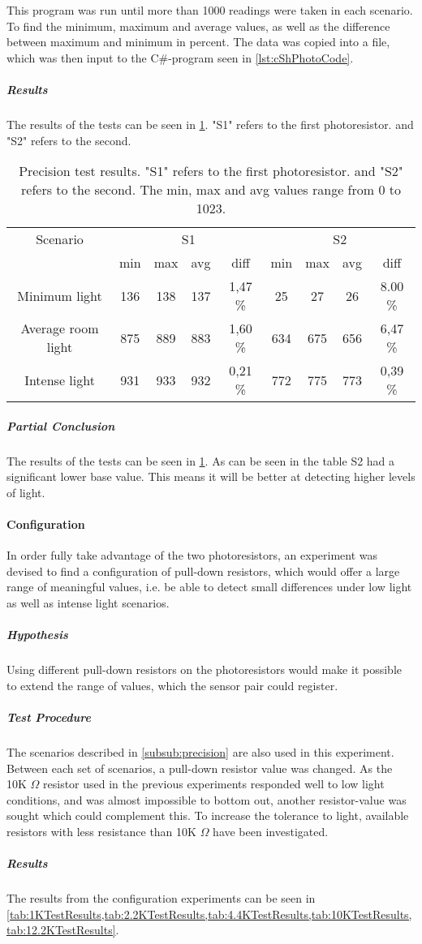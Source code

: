 This program was run until more than 1000 readings were taken in each scenario.
To find the minimum, maximum and average values, as well as the difference between maximum and minimum in percent. The data was copied into a file, which was then input to the C\#-program seen in \cref{lst:cShPhotoCode}.

\subparagraph{Results}
The results of the tests can be seen in \cref{tab:precisionTestResults}. "S1" refers to the first photoresistor. and "S2" refers to the second.

  \begin{table}[htbp]
    \centering
    \begin{tabular}{*{9}{c}}
      \toprule
      Scenario & \multicolumn{4}{c}{S1} & \multicolumn{4}{c}{S2} \\
      \cmidrule(rl){2-5} 
      \cmidrule(rl){6-9}
       & min & max & avg & diff & min & max & avg & diff \\ \midrule
      Minimum light & 136 & 138 & 137 & 1,47 \% & 25 & 27 & 26 & 8.00 \% \\
      Average room light & 875 & 889 & 883 & 1,60 \%  & 634 & 675 & 656 & 6,47 \% \\
      Intense light & 931 & 933 & 932 & 0,21 \%  & 772 & 775 & 773 & 0,39 \% \\ \bottomrule
    \end{tabular}
    \caption[Precision test results]{Precision test results. "S1" refers to the first photoresistor. and
      "S2" refers to the second. The min, max and avg values range from 0 to 1023.}\label{tab:precisionTestResults}
  \end{table}

\subparagraph{Partial Conclusion}
The results of the tests can be seen in \cref{tab:precisionTestResults}. As can be seen in the table S2 had a significant lower base value. This means it will be better at detecting higher levels of light.

\paragraph{Configuration}
In order fully take advantage of the two photoresistors, an experiment was devised to find a configuration of pull-down resistors, which would offer a large range of meaningful values, i.e. be able to detect small differences under low light as well as intense light scenarios.
\subparagraph{Hypothesis}
Using different pull-down resistors on the photoresistors would make it possible to extend the range of values, which the sensor pair could register.
\subparagraph{Test Procedure}
The scenarios described in \cref{subsub:precision} are also used in this experiment. Between each set of scenarios, a pull-down resistor value was changed. As the 10K $\Omega$ resistor used in the previous experiments responded well to low light conditions, and was almost impossible to bottom out, another resistor-value was sought which could complement this. To increase the tolerance to light, available resistors with less resistance than 10K $\Omega$ have been investigated.
\subparagraph{Results}
The results from the configuration experiments can be seen in \cref{tab:1KTestResults,tab:2.2KTestResults,tab:4.4KTestResults,tab:10KTestResults,tab:12.2KTestResults}.

